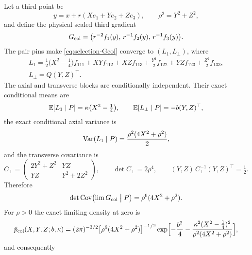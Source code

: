 \begin{lemma}\label{lem:selection-collarchart}
Let a third point be
\begin{equation}\label{eq:selection-collarpt}
y=x+r(Xe_1+Ye_2+Ze_3),\qquad\rho^2=Y^2+Z^2,
\end{equation}
and define the physical scaled third gradient
\begin{equation}\label{eq:selection-Gcol}
G_{\rm col}=\bigl(r^{-2}f_1(y),\,r^{-1}f_2(y),\,r^{-1}f_3(y)\bigr).
\end{equation}
The pair pins make \eqref{eq:selection-Gcol} converge to $(L_1,L_\perp)$, where
\begin{gather}
L_1=\tfrac12\bigl(X^2-\tfrac14\bigr)f_{111}+XYf_{112}+XZf_{113}+\tfrac{Y^2}2f_{122}+YZf_{123}+\tfrac{Z^2}2f_{133},\label{eq:selection-L1}\\
L_\perp=Q(Y,Z)^{\top}.\label{eq:selection-Lperp}
\end{gather}
The axial and transverse blocks are conditionally independent. Their exact conditional means are
\begin{equation}\label{eq:selection-colmeans}
\mathbb E[L_1\mid P]=\kappa\bigl(X^2-\tfrac14\bigr),\qquad\mathbb E[L_\perp\mid P]=-b(Y,Z)^{\top},
\end{equation}
the exact conditional axial variance is
\begin{equation}\label{eq:selection-colvar}
\operatorname{Var}(L_1\mid P)=\frac{\rho^2(4X^2+\rho^2)}2,
\end{equation}
and the transverse covariance is
\begin{equation}\label{eq:selection-Cperp}
C_\perp=\begin{pmatrix}2Y^2+Z^2&YZ\\YZ&Y^2+2Z^2\end{pmatrix},\qquad\det C_\perp=2\rho^4,\qquad(Y,Z)\,C_\perp^{-1}(Y,Z)^{\top}=\tfrac12 .
\end{equation}
Therefore
\begin{equation}\label{eq:selection-coldet}
\det\operatorname{Cov}\bigl(\lim G_{\rm col}\bigm|P\bigr)=\rho^6(4X^2+\rho^2).
\end{equation}
For $\rho>0$ the exact limiting density at zero is
\begin{equation}\label{eq:selection-coldens}
\hat p_{\rm col}(X,Y,Z;b,\kappa)=(2\pi)^{-3/2}\bigl[\rho^6(4X^2+\rho^2)\bigr]^{-1/2}\exp\Bigl[-\frac{b^2}4-\frac{\kappa^2(X^2-\frac14)^2}{\rho^2(4X^2+\rho^2)}\Bigr],
\end{equation}
and consequently
\begin{equation}\label{eq:selection-colscale}

\end{equation}
\end{lemma}
